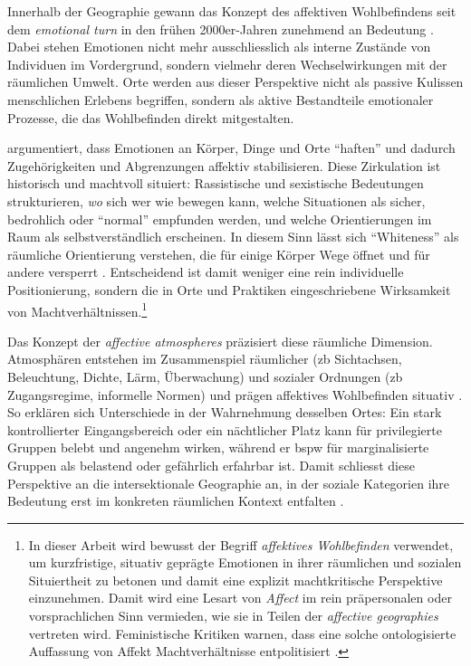 Innerhalb der Geographie gewann das Konzept des affektiven Wohlbefindens seit dem \emph{emotional turn} in den frühen 2000er-Jahren zunehmend an Bedeutung \parencite{hoSocialGeographyIII2024}. Dabei stehen Emotionen nicht mehr ausschliesslich als interne Zustände von Individuen im Vordergrund, sondern vielmehr deren Wechselwirkungen mit der räumlichen Umwelt. Orte werden aus dieser Perspektive nicht als passive Kulissen menschlichen Erlebens begriffen, sondern als aktive Bestandteile emotionaler Prozesse, die das Wohlbefinden direkt mitgestalten.

\textcite{ahmedAffectiveEconomies2004} argumentiert, dass Emotionen an Körper, Dinge und Orte \enquote{haften} und dadurch Zugehörigkeiten und Abgrenzungen affektiv stabilisieren. Diese Zirkulation ist historisch und machtvoll situiert: Rassistische und sexistische Bedeutungen strukturieren, \emph{wo} sich wer wie bewegen kann, welche Situationen als sicher, bedrohlich oder \enquote{normal} empfunden werden, und welche Orientierungen im Raum als selbstverständlich erscheinen. In diesem Sinn lässt sich \enquote{Whiteness} als räumliche Orientierung verstehen, die für einige Körper Wege öffnet und für andere versperrt \parencite{ahmedPhenomenologyWhiteness2007}. Entscheidend ist damit weniger eine rein individuelle Positionierung, sondern die in Orte und Praktiken eingeschriebene Wirksamkeit von Machtverhältnissen.\footnote{In dieser Arbeit wird bewusst der Begriff \emph{affektives Wohlbefinden} verwendet, um kurzfristige, situativ geprägte Emotionen in ihrer räumlichen und sozialen Situiertheit zu betonen und damit eine explizit machtkritische Perspektive einzunehmen. Damit wird eine Lesart von \emph{Affect} im rein präpersonalen oder vorsprachlichen Sinn vermieden, wie sie in Teilen der \emph{affective geographies} vertreten wird. Feministische Kritiken warnen, dass eine solche ontologisierte Auffassung von Affekt Machtverhältnisse entpolitisiert \parencite{hemmingsInvokingAffectCultural2005,andersonAffectiveAtmospheres2009}.}

Das Konzept der \emph{affective atmospheres} präzisiert diese räumliche Dimension. Atmosphären entstehen im Zusammenspiel räumlicher (\gls{zb} Sichtachsen, Beleuchtung, Dichte, Lärm, Überwachung) und sozialer Ordnungen (\gls{zb} Zugangsregime, informelle Normen) und prägen affektives Wohlbefinden situativ \parencite{andersonAffectiveAtmospheres2009}. So erklären sich Unterschiede in der Wahrnehmung desselben Ortes: Ein stark kontrollierter Eingangsbereich oder ein nächtlicher Platz kann für privilegierte Gruppen belebt und angenehm wirken, während er \gls{bspw} für marginalisierte Gruppen als belastend oder gefährlich erfahrbar ist. Damit schliesst diese Perspektive an die intersektionale Geographie an, in der soziale Kategorien ihre Bedeutung erst im konkreten räumlichen Kontext entfalten \parencite{valentineTheorizingResearchingIntersectionality2007,rodo-de-zarateIntersectionalityFeministGeographies2018}.

